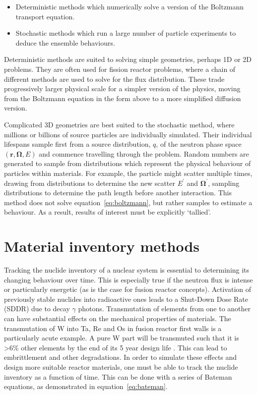 \begin{itemize}
  \item Deterministic methods which numerically solve a version of the Boltzmann transport equation.
  \item Stochastic methods which run a large number of particle experiments to deduce the ensemble behaviours.
\end{itemize}

Deterministic methods are suited to solving simple geometries, perhaps 1D or 2D problems. They are often used for fission reactor problems, where a chain of different methods are used to solve for the flux distribution. These trade progressively larger physical scale for a simpler version of the physics, moving from the Boltzmann equation in the form above to a more simplified diffusion version. 

Complicated 3D geometries are best suited to the stochastic method, where millions or billions of source particles are individually simulated. Their individual lifespans sample first from a source distribution, $q$, of the neutron phase space $(\bm{r},\bm{\Omega},E)$ and commence travelling through the problem. Random numbers are generated to sample from distributions which represent the physical behaviour of particles within materials. For example, the particle might scatter multiple times, drawing from distributions to determine the new scatter $E^{\prime}$ and $\bm{\Omega^{\prime}}$, sampling distributions to determine the path length before another interaction. This method does not solve equation~\ref{eq:boltzmann}, but rather samples to estimate a behaviour. As a result, results of interest must be explicitly `tallied'.


\section{Material inventory methods}
Tracking the nuclide inventory of a nuclear system is essential to determining its changing behaviour over time. This is especially true if the neutron flux is intense or particularly energetic (as is the case for fusion reactor concepts). Activation of previously stable nuclides into radioactive ones leads to a Shut-Down Dose Rate (SDDR) due to decay $\gamma$ photons. Transmutation of elements from one to another can have substantial effects on the mechanical properties of materials. The transmutation of W into Ta, Re and Os in fusion reactor first walls is a particularly acute example. A pure W part will be transmuted such that it is >6\% other elements by the end of its 5 year design life \cite{Gilbert2011}. This can lead to embrittlement and other degradations. In order to simulate these effects and design more suitable reactor materials, one must be able to track the nuclide inventory as a function of time. This can be done with a series of Bateman equations, as demonstrated in equation~\ref{eq:bateman}.

